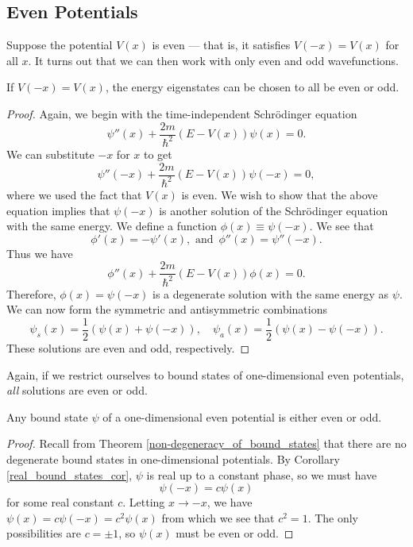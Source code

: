 \subsection{Even Potentials}\label{even_potentials}

Suppose the potential $V(x)$ is even --- that is, it satisfies $V(-x)=V(x)$ for all $x$. It turns out that we can then work with only even and odd wavefunctions.

\begin{framedthm}\label{even_potential_thm}
    If $V(-x)=V(x)$, the energy eigenstates can be chosen to all be even or odd.

    \begin{proof} Again, we begin with the time-independent Schrödinger equation $$\psi''(x)+\frac{2m}{\hbar^2}(E-V(x))\psi(x)=0.$$We can substitute $-x$ for $x$ to get $$\psi''(-x)+\frac{2m}{\hbar^2}(E-V(x))\psi(-x)=0,$$where we used the fact that $V(x)$ is even. We wish to show that the above equation implies that $\psi(-x)$ is another solution of the Schrödinger equation with the same energy. We define a function $\phi(x)\equiv\psi(-x)$. We see that $$\phi'(x)=-\psi'(x), \text{ and  }\,\phi''(x)=\psi''(-x).$$Thus we have $$\phi''(x)+\frac{2m}{\hbar^2}(E-V(x))\phi(x)=0.$$Therefore, $\phi(x)=\psi(-x)$ is a degenerate solution with the same energy as $\psi$. We can now form the symmetric and antisymmetric combinations $$\psi_s(x)=\frac{1}{2}(\psi(x)+\psi(-x)),\quad\psi_a(x)=\frac{1}{2}(\psi(x)-\psi(-x)).$$These solutions are even and odd, respectively. \end{proof}
\end{framedthm}

Again, if we restrict ourselves to bound states of one-dimensional even potentials, \textit{all} solutions are even or odd.

\begin{framedcor}\label{even_potential_cor}
    Any bound state $\psi$ of a one-dimensional even potential is either even or odd.

    \begin{proof}
        Recall from Theorem \ref{non-degeneracy_of_bound_states} that there are no degenerate bound states in one-dimensional potentials. By Corollary \ref{real_bound_states_cor}, $\psi$ is real up to a constant phase, so we must have $$\psi(-x)=c\psi(x)$$for some real constant $c$. Letting $x\rightarrow -x$, we have $\psi(x)=c\psi(-x)=c^2\psi(x)$ from which we see that $c^2=1$. The only possibilities are $c=\pm 1$, so $\psi(x)$ must be even or odd.
    \end{proof}
\end{framedcor}

